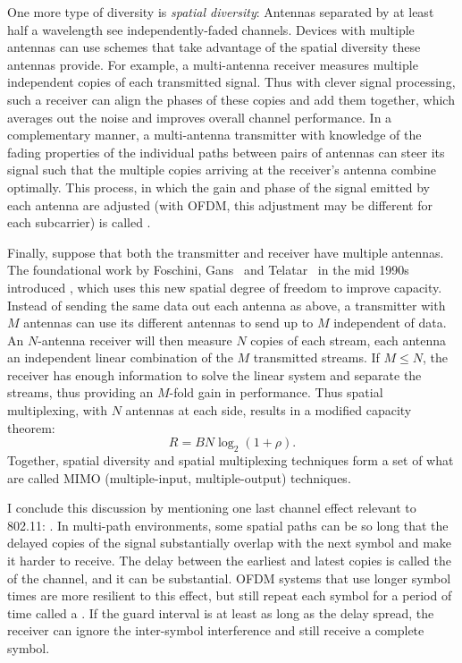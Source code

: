 One more type of diversity is \emph{spatial diversity}: Antennas separated by at least half a wavelength see independently-faded channels. Devices with multiple antennas can use schemes that take advantage of the spatial diversity these antennas provide. For example, a multi-antenna receiver measures multiple independent copies of each transmitted signal. Thus with clever signal processing, such a receiver can align the phases of these copies and add them together, which averages out the noise and improves overall channel performance. In a complementary manner, a multi-antenna transmitter with knowledge of the fading properties of the individual paths between pairs of antennas can steer its signal such that the multiple copies arriving at the receiver's antenna combine optimally. This process, in which the gain and phase of the signal emitted by each antenna are adjusted (with OFDM, this adjustment may be different for each subcarrier) is called .

Finally, suppose that both the transmitter and receiver have multiple antennas. The foundational work by Foschini, Gans~\cite{Foschini_Gans} and Telatar~\cite{Telatar_MIMO} in the mid 1990s introduced , which uses this new spatial degree of freedom to improve capacity. Instead of sending the same data out each antenna as above, a transmitter with $M$ antennas can use its different antennas to send up to $M$ independent  of data. An $N$-antenna receiver will then measure $N$ copies of each stream, each antenna an independent linear combination of the $M$ transmitted streams. If $M \leq N$, the receiver has enough information to solve the linear system and separate the streams, thus providing an $M$-fold gain in performance. Thus spatial multiplexing, with $N$ antennas at each side, results in a modified capacity theorem:
\begin{equation}
\label{eq:mimo_capacity}
R = BN\log_2(1+\rho).
\end{equation}
Together, spatial diversity and spatial multiplexing techniques form a set of what are called MIMO (multiple-input, multiple-output) techniques.

I conclude this discussion by mentioning one last channel effect relevant to 802.11: . In multi-path environments, some spatial paths can be so long that the delayed copies of the signal substantially overlap with the next symbol and make it harder to receive. The delay between the earliest and latest copies is called the  of the channel, and it can be substantial. OFDM systems that use longer symbol times are more resilient to this effect, but still repeat each symbol for a period of time called a . If the guard interval is at least as long as the delay spread, the receiver can ignore the inter-symbol interference and still receive a complete symbol.

